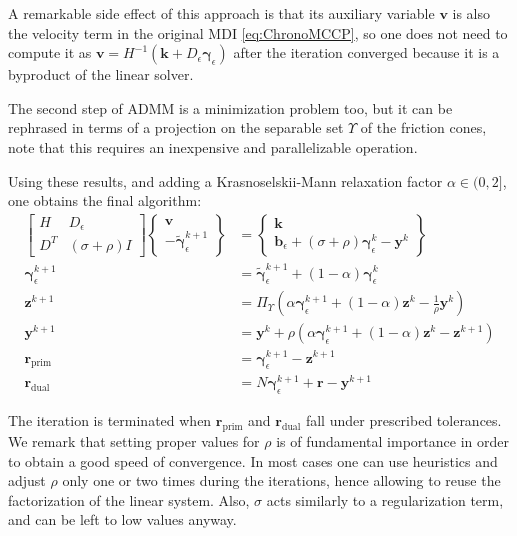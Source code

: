 \documentclass{svproc}
\newcommand{\vect}[1]{\bm{#1}}
\begin{document}
A remarkable side effect of this approach is that its auxiliary variable $\vect{v}$ is also the velocity term in the original MDI 
\eqref{eq:ChronoMCCP}, so one does not need to compute it as $\vect{v}=H^{-1}(\vect{k} + D_\epsilon \vect{\gamma}_\epsilon )$ after the iteration converged because it is a byproduct of the linear solver.

The second step of ADMM is a minimization problem too, but it can be rephrased in terms of a projection on the separable set $\Upsilon$ of the friction cones, note that this requires an inexpensive and parallelizable operation. 

Using these results, and adding a Krasnoselskii-Mann relaxation factor $\alpha \in(0,2]$, one obtains the final algorithm:
%
\begin{subequations}
	\begin{align}
    \begin{bmatrix}
		 H   & D_\epsilon \\
		 D^T & (\sigma+\rho) I
		\end{bmatrix}
		\begin{Bmatrix}
		 \vect{v}    \\
		 -\tilde{\vect{\gamma}}_\epsilon^{k+1}
		\end{Bmatrix}
		&=
		\begin{Bmatrix}
		 \vect{k} \\
		 \vect{b}_\epsilon + (\sigma+\rho) \vect{\gamma}_\epsilon^k-\vect{y}^k 
		\end{Bmatrix}
		\\
		\vect{\gamma}^{k+1}_\epsilon &=\tilde{\vect{\gamma}}_\epsilon^{k+1} + (1-\alpha) \vect{\gamma}_\epsilon^k \\
		\vect{z}^{k+1} &= \Pi_\Upsilon \left( \alpha \vect{\gamma}_\epsilon^{k+1} + (1-\alpha) \vect{z}^k  - \frac{1}{\rho} \vect{y}^k \right) \\
		\vect{y}^{k+1} &= \vect{y}^k + \rho \left( \alpha \vect{\gamma}_\epsilon^{k+1} + (1-\alpha) \vect{z}^k - \vect{z}^{k+1} \right) \\
		\vect{r}_{\text{prim}} &= \vect{\gamma}_\epsilon^{k+1}-\vect{z}^{k+1} \\
		\vect{r}_{\text{dual}} &= N \vect{\gamma}_\epsilon^{k+1}+\vect{r}-\vect{y}^{k+1} 
	\end{align}
	\label{eq:admm_final}
\end{subequations}

The iteration is terminated when $\vect{r}_{\text{prim}}$ and $\vect{r}_{\text{dual}}$ fall under prescribed tolerances. We remark that setting proper values for $\rho$ is of fundamental importance in order to obtain a good speed of convergence. In most cases one can use heuristics and adjust $\rho$ only one or two times during the iterations, hence allowing to reuse the factorization of the linear system. Also, $\sigma$ acts similarly to a regularization term, and can be left to low values anyway.
\end{document}
